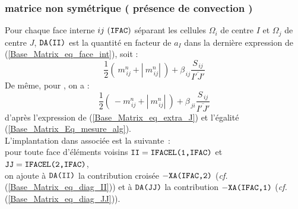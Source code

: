 \subsubsection*{matrice non sym\'etrique ( pr\'esence de convection ) }
Pour chaque face interne $ij\ ( \text{\texttt{IFAC}} )$ s\'eparant les cellules $\Omega_i$
de centre $I$ et $\Omega_j$ de centre $J$, $\text{\texttt{DA(II)}}$ est la quantit\'e en facteur de $a_I$ dans la
derni\`ere expression de (\ref{Base_Matrix_eq_face_int}), soit :
\begin{equation}\label{Base_Matrix_eq_diag_II}
\displaystyle\frac{1}{2}(\ m_{\,ij}^n + |\ m_{\,ij}^n|\ )+\displaystyle
\beta_{\,ij}\frac {S_{\,ij}}{\overline{I'J'}}
\end{equation}
De m\^eme, pour , on a :
\begin{equation}\label{Base_Matrix_eq_diag_JJ}
\displaystyle\frac{1}{2}(\ - m_{\,ij}^n + |\ m_{\,ij}^n|\ )+\displaystyle
\beta_{\,ji}\frac {S_{\,ij}}{\overline{I'J'}}
\end{equation}
d'apr\`es l'expression de (\ref{Base_Matrix_eq_extra_J}) et l'\'egalit\'e (\ref{Base_Matrix_Eq_mesure_alg}).\\
L'implantation dans \CS associ\'ee est la suivante~:\\
pour toute face  d'\'el\'ements voisins $\text{\texttt{II}} =
\text{\texttt{IFACEL(1,IFAC)}}$ et $\text{\texttt{JJ}} = \text{\texttt{IFACEL(2,IFAC)}}$,\\
on ajoute \`a
$\text{\texttt{DA(II)}}$ la contribution crois\'ee $-\text{\texttt{XA(IFAC,2)}}$ ({\it cf.}
(\ref{Base_Matrix_eq_diag_II}))  et
\`a
$\text{\texttt{DA(JJ)}}$ la contribution $-\text{\texttt{XA(IFAC,1)}}$ ({\it cf.}
(\ref{Base_Matrix_eq_diag_JJ})).

